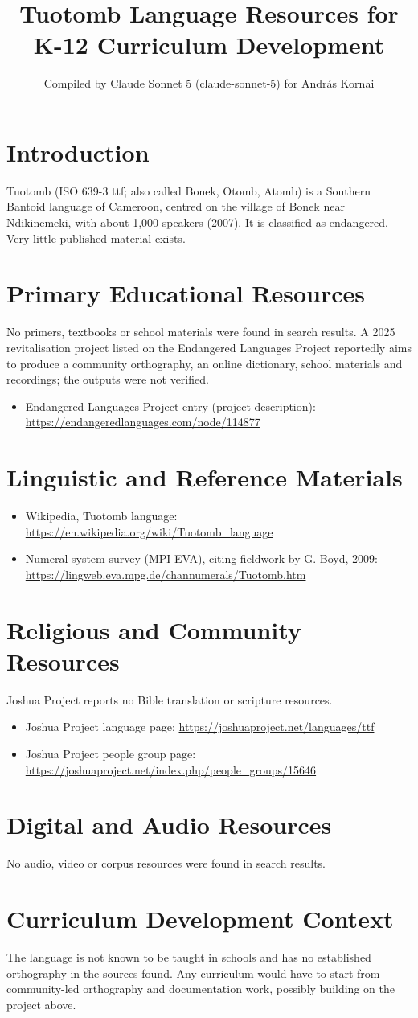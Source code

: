 \documentclass[12pt]{article}
\title{Tuotomb Language Resources for K-12 Curriculum Development}
\author{Compiled by Claude Sonnet 5 (claude-sonnet-5) for Andr\'as Kornai}
\date{}
\begin{document}
\maketitle
\section{Introduction}
Tuotomb (ISO 639-3 ttf; also called Bonek, Otomb, Atomb) is a Southern Bantoid language of Cameroon, centred on the village of Bonek near Ndikinemeki, with about 1,000 speakers (2007). It is classified as endangered. Very little published material exists.
\section{Primary Educational Resources}
No primers, textbooks or school materials were found in search results. A 2025 revitalisation project listed on the Endangered Languages Project reportedly aims to produce a community orthography, an online dictionary, school materials and recordings; the outputs were not verified.
\begin{itemize}
\item Endangered Languages Project entry (project description): \url{https://endangeredlanguages.com/node/114877}
\end{itemize}
\section{Linguistic and Reference Materials}
\begin{itemize}
\item Wikipedia, Tuotomb language: \url{https://en.wikipedia.org/wiki/Tuotomb_language}
\item Numeral system survey (MPI-EVA), citing fieldwork by G. Boyd, 2009: \url{https://lingweb.eva.mpg.de/channumerals/Tuotomb.htm}
\end{itemize}
\section{Religious and Community Resources}
Joshua Project reports no Bible translation or scripture resources.
\begin{itemize}
\item Joshua Project language page: \url{https://joshuaproject.net/languages/ttf}
\item Joshua Project people group page: \url{https://joshuaproject.net/index.php/people_groups/15646}
\end{itemize}
\section{Digital and Audio Resources}
No audio, video or corpus resources were found in search results.
\section{Curriculum Development Context}
The language is not known to be taught in schools and has no established orthography in the sources found. Any curriculum would have to start from community-led orthography and documentation work, possibly building on the project above.
\end{document}
